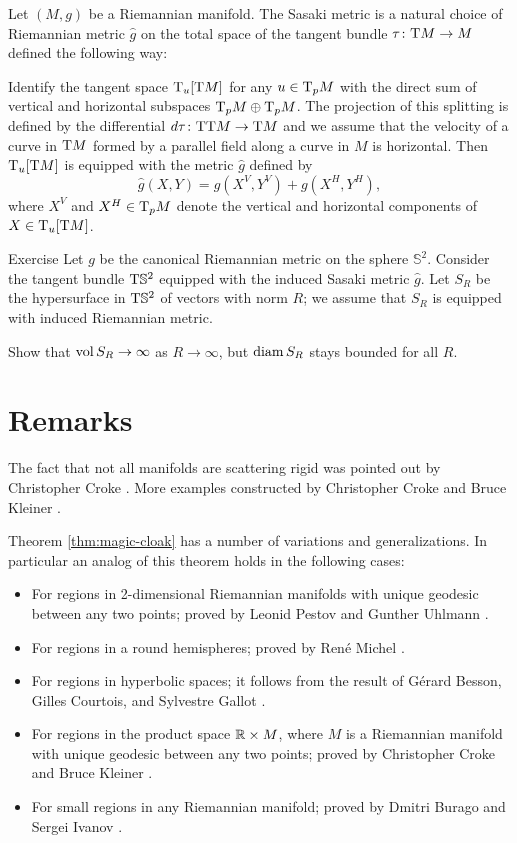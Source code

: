 \bigskip

Let $(M,g)$ be a Riemannian manifold.
The Sasaki metric is a natural choice of Riemannian metric $\hat g$ on the total space of the tangent bundle $\tau\colon\mathrm{T} M\to M$ defined the following way:

Identify the tangent space 
$\mathrm{T}_u[\mathrm{T} M]$ for any $u\z\in \T_p M$ with the direct sum of vertical and horizontal subspaces $\T_p M\z\oplus \T_p M$.
The projection of this splitting is defined by the differential $d\tau\colon\mathrm{T}\mathrm{T} M\to \mathrm{T} M$
and we assume that the velocity of a curve in $\mathrm{T} M$ formed by a parallel field along a curve in $M$ is horizontal.
Then $\mathrm{T}_u[\mathrm{T} M]$ is equipped with the metric $\hat g$ defined by
\[\hat g(X,Y)=g(X^V,Y^V)+g(X^H,Y^H),\]
where $X^V$ and $X^H\in\mathrm{T}_pM$ denote the vertical and horizontal components of $X\in\mathrm{T}_u[\mathrm{T} M]$.



\begin{thm}{Exercise}
Let $g$ be the canonical Riemannian metric on the sphere $\mathbb{S}^2$.
Consider the tangent bundle $\mathrm{T} \mathbb{S}^2$ 
equipped with the induced Sasaki metric $\hat g$.
Let $S_R$ be the hypersurface in $\mathrm{T} \mathbb{S}^2$ of vectors with norm $R$;
we assume that $S_R$ is equipped with induced Riemannian metric.

Show that $\operatorname{\rm vol}\nolimits S_R\to \infty$ as $R\to\infty$,
but $\operatorname{\rm diam}\nolimits S_R$ stays bounded for all $R$.
\end{thm}



\section{Remarks}

The fact that not all manifolds are scattering rigid was pointed out by Christopher Croke \cite{croke-1991}.
More examples constructed by Christopher Croke and Bruce Kleiner \cite{croke-kleiner-1994}.

Theorem \ref{thm:magic-cloak} has a number of variations and generalizations.
In particular an analog of this theorem holds in the following cases:
\begin{itemize}
\item For regions in 2-dimensional Riemannian manifolds with unique geodesic between any two points; proved by Leonid Pestov and Gunther Uhlmann \cite{pestov-uhlmann}.
\item For regions in a round  hemispheres; proved by Ren\'{e} Michel \cite{michel-1981}.
\item For regions in hyperbolic spaces; it follows from the result of Gérard Besson, Gilles Courtois, and Sylvestre Gallot \cite{besson-courtois-gallot-1995}.
\item For regions in the product space $\mathbb{R}\times M$, where $M$ is a Riemannian manifold with unique geodesic between any two points; proved by Christopher Croke and Bruce Kleiner \cite{croke-kleiner-1998}.
\item For small regions in any Riemannian manifold; proved by Dmitri Burago and Sergei Ivanov \cite{burago-ivanov-2010}.
\end{itemize}




